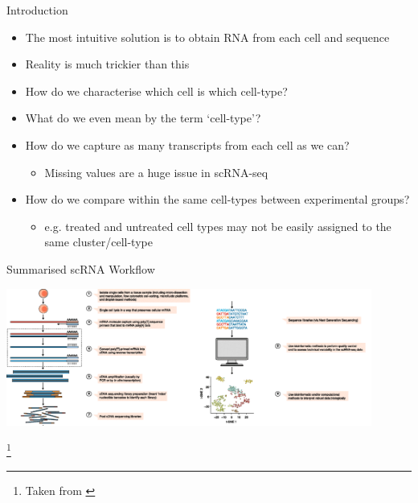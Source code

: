 \documentclass[aspectratio=169,11pt]{beamer}
\newcommand\blfootnote[1]{%
  \begingroup
  \renewcommand\thefootnote{}\footnote{#1}%
  \addtocounter{footnote}{-1}%
  \endgroup
}
\begin{document}
\begin{frame}{Introduction}

	\begin{itemize}
		\item The most intuitive solution is to obtain RNA from each cell and sequence
		\item Reality is much trickier than this
		\pause
		\item How do we characterise which cell is which cell-type?
		\item What do we even mean by the term `cell-type'?
		\item How do we capture as many transcripts from each cell as we can?
		\begin{itemize}
			\item Missing values are a huge issue in scRNA-seq
		\end{itemize}
		\item How do we compare within the same cell-types between experimental groups?
		\begin{itemize}
			\item e.g. treated and untreated cell types may not be easily assigned to the same cluster/cell-type
		\end{itemize}
	\end{itemize}

\end{frame}


\begin{frame}{Summarised scRNA Workflow}

	\begin{center}
	\includegraphics[width=0.9\textwidth]{figures/scRNAWorkflow.png} 
	\end{center}
	
	\blfootnote{Taken from \cite{pmid28821273}}

\end{frame}
\end{document}
